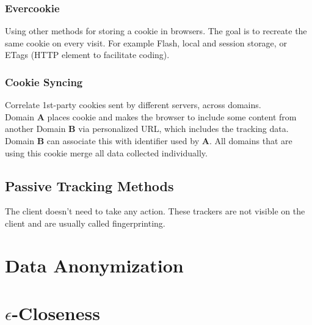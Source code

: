 \documentclass{report}
\begin{document}
		\subsection{Evercookie}
		\startsubsection
			Using other methods for storing a cookie in browsers. The goal is to recreate the same cookie on every visit. For example Flash, local and session storage, or ETags (HTTP element to facilitate coding).
		\closesection
		\subsection{Cookie Syncing}
		\startsubsection
			Correlate 1st-party cookies sent by different servers, across domains. \\
			Domain \textbf{A} places cookie and makes the browser to include some content from another Domain \textbf{B} via personalized URL, which includes the tracking data. Domain \textbf{B} can associate this with identifier used by \textbf{A}. All domains that are using this cookie merge all data collected individually.
		\closesection
	\closesection
	\section{Passive Tracking Methods}
	\startsection
		The client doesn't need to take any action. These trackers are not visible on the client and are usually called fingerprinting.
	\closesection
	
	\chapter{Data Anonymization}
	
	\chapter{$\epsilon$-Closeness}
\end{document}
